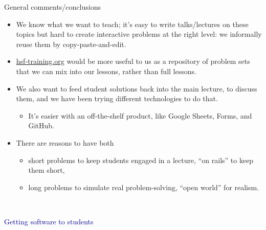 \documentclass[aspectratio=169]{beamer}
\begin{document}
\begin{frame}{General comments/conclusions}
\large
\vspace{0.5 cm}
\begin{itemize}\setlength{\itemsep}{0.45 cm}
\item<1-> We know what we want to teach; it's easy to write talks/lectures on these topics but hard to create interactive problems at the right level: we informally reuse them by copy-paste-and-edit.
\item<2-> \textcolor{blue}{\url{hsf-training.org}} would be more useful to us as a repository of problem sets that we can mix into our lessons, rather than full lessons.
\item<3-> We also want to feed student solutions back into the main lecture, to discuss them, and we have been trying different technologies to do that.
\begin{itemize}
\item It's easier with an off-the-shelf product, like Google Sheets, Forms, and GitHub.
\end{itemize}
\item<4-> There are reasons to have both
\begin{itemize}
\item short problems to keep students engaged in a lecture, ``on rails'' to keep them short,
\item long problems to simulate real problem-solving, ``open world'' for realism.
\end{itemize}

\end{itemize}
\end{frame}

\begin{frame}{\mbox{ }}
\LARGE
\begin{center}
\textcolor{darkblue}{Getting software to students}
\end{center}
\end{frame}
\end{document}
